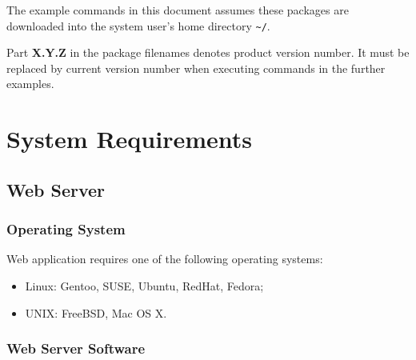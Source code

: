\documentclass[12pt]{article}
\newcommand{\vigReleasePath}{\textasciitilde/}
\newcommand{\vigReleaseVersion}{X.Y.Z}
\begin{document}
The example commands in this document assumes these packages are downloaded into the system user's home directory \texttt{{\vigReleasePath}}.

Part \textbf{\vigReleaseVersion} in the package filenames denotes product version number. It must be replaced by current version number when executing commands in the further examples.

\section{System Requirements}

\subsection{Web Server}

\subsubsection{Operating System}
Web application requires one of the following operating systems:
\begin{itemize}
	\item Linux: Gentoo, SUSE, Ubuntu, RedHat, Fedora;
	\item UNIX: FreeBSD, Mac OS X.
\end{itemize}

\subsubsection{Web Server Software}
\end{document}
